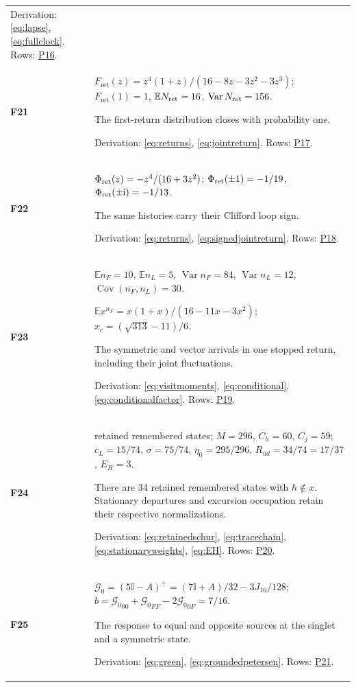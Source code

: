 \documentclass[aps,prx,onecolumn,10pt,notitlepage,nofootinbib,longbibliography]{revtex4-2}
\numberwithin{equation}{section}
\numberwithin{table}{section}
\newcommand{\Id}{\mathbb I}
\newcommand{\EE}{\mathbb E}
\newcommand{\Var}{\operatorname{Var}}
\newcommand{\Cov}{\operatorname{Cov}}
\newcommand{\ii}{\mathrm i}
\newcommand{\Fret}{F_{\mathrm{ret}}}
\newcommand{\Phis}{\Phi_{\rm ret}}
\begin{document}
\begin{longtable}{@{}>{\raggedright\arraybackslash}p{}>{\raggedright\arraybackslash}p{}@{}}
Derivation: \eqref{eq:lapse}, \eqref{eq:fullclock}. Rows: \hyperlink{row-P16}{P16}.\\[7pt]
\hypertarget{formula-F21}{}\textbf{F21}\label{formula:F21} & $\Fret(z)=z^4(1+z)/(16-8z-3z^2-3z^3)$; $\Fret(1)=1$, $\EE N_{\rm ret}=16$, $\Var N_{\rm ret}=156$.\par
The first-return distribution closes with probability one.\par
Derivation: \eqref{eq:returns}, \eqref{eq:jointreturn}. Rows: \hyperlink{row-P17}{P17}.\\[7pt]
\hypertarget{formula-F22}{}\textbf{F22}\label{formula:F22} & $\Phis(z)=-z^4/(16+3z^2)$; $\Phis(\pm1)=-1/19$, $\Phis(\pm\ii)=-1/13$.\par
The same histories carry their Clifford loop sign.\par
Derivation: \eqref{eq:returns}, \eqref{eq:signedjointreturn}. Rows: \hyperlink{row-P18}{P18}.\\[7pt]
\hypertarget{formula-F23}{}\textbf{F23}\label{formula:F23} & $\EE n_F=10$, $\EE n_L=5$, $\Var n_F=84$, $\Var n_L=12$, $\Cov(n_F,n_L)=30$.\par $\EE x^{n_F}=x(1+x)/(16-11x-3x^2)$; $x_c=(\sqrt{313}-11)/6$.\par
The symmetric and vector arrivals in one stopped return, including their joint fluctuations.\par
Derivation: \eqref{eq:visitmoments}, \eqref{eq:conditional}, \eqref{eq:conditionalfactor}. Rows: \hyperlink{row-P19}{P19}.\\[7pt]
\hypertarget{formula-F24}{}\textbf{F24}\label{formula:F24} & 74 retained remembered states; $M=296$, $C_h=60$, $C_j=59$; $c_L=15/74$, $\sigma=75/74$, $\eta_0=295/296$, $R_{ud}=34/74=17/37$, $E_H=3$.\par
There are 34 retained remembered states with $h\notin x$. Stationary departures and excursion occupation retain their respective normalizations.\par
Derivation: \eqref{eq:retainedschur}, \eqref{eq:tracechain}, \eqref{eq:stationaryweights}, \eqref{eq:EH}. Rows: \hyperlink{row-P20}{P20}.\\[7pt]
\hypertarget{formula-F25}{}\textbf{F25}\label{formula:F25} & ${\mathcal G_0}=(5\Id-A)^+=(7\Id+A)/32-3J_{16}/128$; $b={\mathcal G_0}_{00}+{\mathcal G_0}_{FF}-2{\mathcal G_0}_{0F}=7/16$.\par
The response to equal and opposite sources at the singlet and a symmetric state.\par
Derivation: \eqref{eq:green}, \eqref{eq:groundedpetersen}. Rows: \hyperlink{row-P21}{P21}.\\[7pt]

\end{longtable}
\end{document}
